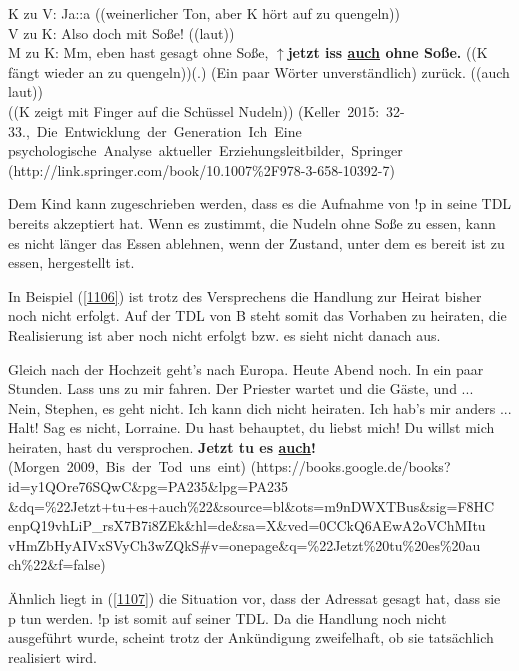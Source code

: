 {\begin{exe}
	K zu V: Ja::a ((weinerlicher Ton, aber K hört auf zu quengeln))\\
	V zu K: Also doch mit Soße! ((laut))\\
	M zu K: Mm, eben hast gesagt \glqq ohne Soße\grqq{}, \textbf{$\uparrow$jetzt iss \underline{auch} ohne Soße.} ((K fängt wieder an zu quengeln))(.) (Ein 	paar Wörter unverständlich) zurück. ((auch laut))\\
	((K zeigt mit Finger auf die Schüssel Nudeln))
	\newline
	\hbox{}\hfill\hbox{(Keller 2015: 32-33., Die Entwicklung der Generation Ich Eine}				 
  	\newline
	\hbox{}\hfill\hbox{psychologische Analyse aktueller Erziehungsleitbilder, Springer}		
	\newline
	\hbox{}\hfill\hbox{(http://link.springer.com/book/10.1007\%2F978-3-658-10392-7)}
\end{exe}
Dem Kind kann zugeschrieben werden, dass es die Aufnahme von !p in seine TDL bereits akzeptiert hat. Wenn es zustimmt, die Nudeln ohne Soße zu essen, kann es nicht länger das Essen ablehnen, wenn der Zustand, unter dem es bereit ist zu essen, hergestellt ist.

In Beispiel (\ref{1106}) ist trotz des Versprechens die Handlung zur Heirat bisher noch nicht erfolgt. Auf der TDL von B steht somit das Vorhaben zu heiraten, die Rea\-lisierung ist aber noch nicht erfolgt bzw. es sieht nicht danach aus.
	
\begin{exe}
	\ex\label{1106} 
	\scriptsize
 	\glqq [...] Gleich nach der Hochzeit geht's nach Europa. Heute Abend noch. In ein paar Stunden. Lass uns
 	zu mir fahren. Der Priester wartet und die Gäste, und ...\grqq{}\\
	\glqq Nein, Stephen, es geht nicht. Ich kann dich nicht heiraten. Ich hab's mir anders ...\grqq{}\\
	\glqq Halt! Sag es nicht, Lorraine. Du hast behauptet, du liebst mich! Du willst mich heiraten, hast du versprochen. \textbf{Jetzt tu es 					\underline{auch}!}\grqq{}	
	\hfill\hbox{(Morgen 2009, Bis der Tod uns eint)}				 
  	\newline
	\hbox{}\hfill\hbox{(https://books.google.de/books?id=y1QOre76SQwC\&pg=PA235\&lpg=PA235}		
	\newline
	\hbox{}\hfill\hbox{\&dq=\%22Jetzt+tu+es+auch\%22\&source=bl\&ots=m9nDWXTBus\&sig=F8HC}	
	\newline
	\hbox{}\hfill\hbox{enpQ19vhLiP\_rsX7B7i8ZEk\&hl=de\&sa=X\&ved=0CCkQ6AEwA2oVChMItu}
	\newline
	\hbox{}\hfill\hbox{vHmZbHyAIVxSVyCh3wZQkS\#v=onepage\&q=\%22Jetzt\%20tu\%20es\%20au}
	\newline
	\hbox{}\hfill\hbox{ch\%22\&f=false)}
\end{exe}	
Ähnlich liegt in (\ref{1107}) die Situation vor, dass der Adressat gesagt hat, dass sie p tun werden. !p ist somit auf seiner TDL. Da die Handlung noch nicht ausgeführt wurde, scheint trotz der Ankündigung zweifelhaft, ob sie tatsächlich realisiert wird.
	
}
